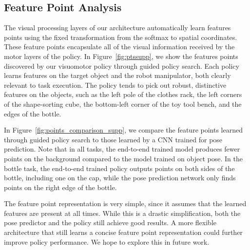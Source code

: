\documentclass[conference]{IEEEtran}
\begin{document}




\clearpage
\subsection{Feature Point Analysis}

The visual processing layers of our architecture automatically learn features points using the fixed transformation from the softmax to spatial coordinates. These feature points encapsulate all of the visual information received by the motor layers of the policy. In Figure~\ref{fig:ptssupp}, we show the features points discovered by our visuomotor policy through guided policy search. Each policy learns features on the target object and the robot manipulator, both clearly relevant to task execution. The policy tends to pick out robust, distinctive features on the objects, such as the left pole of the clothes rack, the left corners of the shape-sorting cube, the bottom-left corner of the toy tool bench, and the edges of the bottle.

In Figure~\ref{fig:points_comparison_supp}, we compare the feature points learned through guided policy search to those learned by a CNN trained for pose prediction. Note that in all tasks, the end-to-end trained model produces fewer points on the background compared to the model trained on object pose. In the bottle task, the end-to-end trained policy outputs points on both sides of the bottle, including one on the cap, while the pose prediction network only finds points on the right edge of the bottle.

The feature point representation is very simple, since it assumes that the learned features are present at all times. While this is a drastic simplification, both the pose predictor and the policy still achieve good results. A more flexible architecture that still learns a concise feature point representation could further improve policy performance. We hope to explore this in future work.
\end{document}
